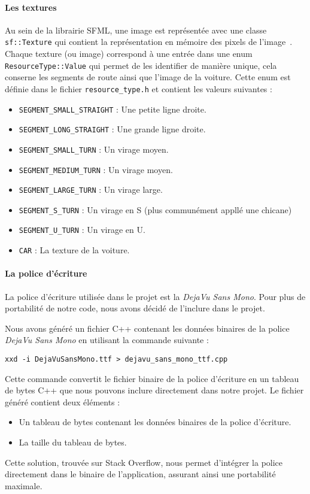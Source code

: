 \paragraph{Les textures}
Au sein de la librairie SFML, une image est représentée avec une classe \texttt{sf::Texture} qui contient la représentation en mémoire des pixels de l'image~\cite{sfml_sf_texture}.
Chaque texture (ou image) correspond à une entrée dans une enum \texttt{ResourceType::Value} qui permet de les identifier de manière unique, cela conserne les segments de route ainsi que l'image de la voiture.
Cette enum est définie dans le fichier \texttt{resource\_type.h} et contient les valeurs suivantes :
\begin{itemize}
    \item \texttt{SEGMENT\_SMALL\_STRAIGHT} : Une petite ligne droite.
    \item \texttt{SEGMENT\_LONG\_STRAIGHT} : Une grande ligne droite.
    \item \texttt{SEGMENT\_SMALL\_TURN} : Un virage moyen.
    \item \texttt{SEGMENT\_MEDIUM\_TURN} : Un virage moyen.
    \item \texttt{SEGMENT\_LARGE\_TURN} : Un virage large.
    \item \texttt{SEGMENT\_S\_TURN} : Un virage en S (plus communément appllé une chicane)
    \item \texttt{SEGMENT\_U\_TURN} : Un virage en U\@.
    \item \texttt{CAR} : La texture de la voiture.
\end{itemize}

\paragraph{La police d'écriture}
La police d'écriture utilisée dans le projet est la \textit{DejaVu Sans Mono}.
Pour plus de portabilité de notre code, nous avons décidé de l'inclure dans le projet.

Nous avons généré un fichier C++ contenant les données binaires de la police \textit{DejaVu Sans Mono} en utilisant la commande suivante :
\begin{lstlisting}[style=BashStyle,label={lst:generation_dejavusansmonottf_h}]
xxd -i DejaVuSansMono.ttf > dejavu_sans_mono_ttf.cpp
\end{lstlisting}
Cette commande convertit le fichier binaire de la police d'écriture en un tableau de bytes C++ que nous pouvons inclure directement dans notre projet.
Le fichier généré contient deux éléments :
\begin{itemize}
    \item Un tableau de bytes contenant les données binaires de la police d'écriture.
    \item La taille du tableau de bytes.
\end{itemize}
Cette solution, trouvée sur Stack Overflow\cite{stackoverflow_embed_font}, nous permet d'intégrer la police directement dans le binaire de l'application, assurant ainsi une portabilité maximale.


